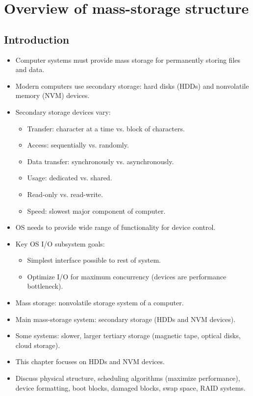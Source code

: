 \section{Overview of mass-storage structure}

\subsection{Introduction}
\begin{itemize}
    \item Computer systems must provide mass storage for permanently storing files and data.
    \item Modern computers use secondary storage: hard disks (HDDs) and nonvolatile memory (NVM) devices.
    \item Secondary storage devices vary:
    \begin{itemize}
        \item Transfer: character at a time vs. block of characters.
        \item Access: sequentially vs. randomly.
        \item Data transfer: synchronously vs. asynchronously.
        \item Usage: dedicated vs. shared.
        \item Read-only vs. read-write.
        \item Speed: slowest major component of computer.
    \end{itemize}
    \item OS needs to provide wide range of functionality for device control.
    \item Key OS I/O subsystem goals:
    \begin{itemize}
        \item Simplest interface possible to rest of system.
        \item Optimize I/O for maximum concurrency (devices are performance bottleneck).
    \end{itemize}
    \item Mass storage: nonvolatile storage system of a computer.
    \item Main mass-storage system: secondary storage (HDDs and NVM devices).
    \item Some systems: slower, larger tertiary storage (magnetic tape, optical disks, cloud storage).
    \item This chapter focuses on HDDs and NVM devices.
    \item Discuss physical structure, scheduling algorithms (maximize performance), device formatting, boot blocks, damaged blocks, swap space, RAID systems.

\end{itemize}
